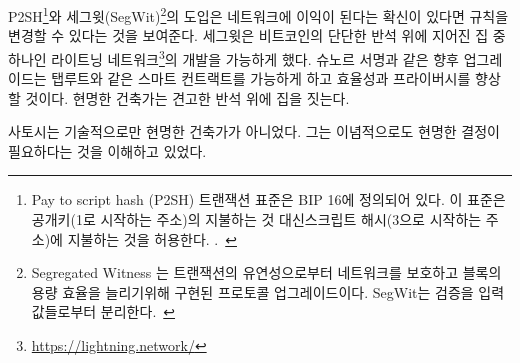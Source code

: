 			\begin{comment}
				The introduction of pay to script hash\footnote{ Pay to script hash (P2SH)
					transactions were standardised in BIP 16. They allow transactions to be sent to
					a script hash (address starting with 3) instead of a public key hash (addresses
					starting with 1).~\cite{btcwiki:p2sh}} and segregated
				witness\footnote{Segregated Witness (abbreviated as SegWit) is an implemented
					protocol upgrade intended to provide protection from transaction malleability
					and increase block capacity. SegWit separates the \textit{witness} from the list
					of inputs.~\cite{btcwiki:segwit}} are proof that Bitcoin's rules can be changed
				if enough users are convinced that adopting said change is to the benefit of the
				network. The latter enabled the development of the lightning
				network\footnote{\url{https://lightning.network/}}, which is one of the houses
				being built on Bitcoin's solid foundation. Future upgrades like Schnorr
				signatures~\cite{bip:schnorr} will enhance efficiency and privacy, as well as
				scripts (read: smart contracts) which will be indistinguishable from regular
				transactions thanks to Taproot~\cite{taproot}. Wise builders do indeed build on
				solid foundations.
			\end{comment}
			P2SH\footnote{Pay to script hash (P2SH)
				트랜잭션 표준은 BIP 16에 정의되어 있다. 이 표준은 공개키(1로 시작하는 주소)의 지불하는 것 대신스크립트 해시(3으로 시작하는 주소)에 지불하는 것을 허용한다.
				.~\cite{btcwiki:p2sh}}와
			세그윗(SegWit)\footnote{Segregated Witness 는
				트랜잭션의 유연성으로부터 네트워크를 보호하고 블록의 용량 효율을 늘리기위해 구현된 프로토콜 업그레이드이다.
				SegWit는 검증을 입력값들로부터 분리한다.~\cite{btcwiki:segwit}}의 도입은
			네트워크에 이익이 된다는 확신이 있다면 규칙을 변경할 수 있다는 것을 보여준다.
			세그윗은 비트코인의 단단한 반석 위에 지어진 집 중 하나인 라이트닝 네트워크\footnote{\url{https://lightning.network/}}의 개발을 가능하게 했다.
			슈노르 서명\cite{bip:schnorr}과 같은 향후 업그레이드는 탭루트와 같은 스마트 컨트랙트를 가능하게 하고 
			효율성과 프라이버시를 향상할 것이다.
			현명한 건축가는 견고한 반석 위에 집을 짓는다.
			
			\begin{comment}
				Satoshi wasn't only a wise builder technologically. He also understood
				that it would be necessary to make wise decisions ideologically.
			\end{comment}
			사토시는 기술적으로만 현명한 건축가가 아니었다.
			그는 이념적으로도 현명한 결정이 필요하다는 것을 이해하고 있었다.
			

